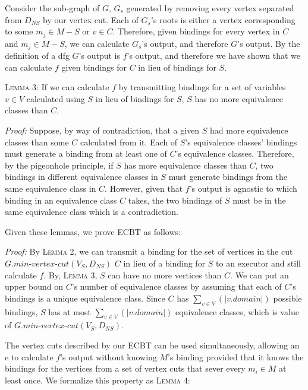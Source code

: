 Consider the sub-graph of $G$, $G_s$ generated by removing every vertex separated from $D_{NS}$ by our vertex cut. Each of $G_s$'s roots is either a vertex corresponding to some $m_j \in M - S$ or $v \in C$. Therefore, given bindings for every vertex in $C$ and $m_j \in M - S$, we can calculate $G_s$'s output, and therefore $G$'s output. By the definition of a dfg $G$'s output is $f$'s output, and therefore we have shown that we can calculate $f$ given bindings for $C$ in lieu of bindings for $S$.

\vspace{1mm}
\noindent \textsc{Lemma 3:} If we can calculate $f$ by transmitting bindings for a set of variables $v \in V$ calculated using $S$ in lieu of bindings for $S$, $S$ has no more equivalence classes than $C$.
\vspace{1mm}

\noindent \textit{Proof:} Suppose, by way of contradiction, that a given $S$ had more equivalence classes than some $C$ calculated from it. Each of $S$'s equivalence classes' bindings must generate a binding from at least one of $C$'s equivalence classes. Therefore, by the pigeonhole principle, if $S$ has more equivalence classes than $C$, two bindings in different equivalence classes in $S$ must generate bindings from the same equivalence class in $C$. However, given that $f$'s output is agnostic to which binding in an equivalence class $C$ takes, the two bindings of $S$ must be in the same equivalence class which is a contradiction.
\vspace{1mm}

\noindent Given these lemmas, we prove ECBT as follows:
\vspace{1mm}

\noindent \textit{Proof:}
By \textsc{Lemma 2}, we can transmit a binding for the set of vertices in the cut $G.\textit{min-vertex-cut}(V_S, D_{NS})$ $C$ in lieu of a binding for $S$ to an executor and still calculate $f$. By, \textsc{Lemma 3}, $S$ can have no more vertices than $C$. We can put an upper bound on $C$'s number of equivalence classes by assuming that each of $C$'s bindings is a unique equivalence class. Since $C$ has $\sum_{v \in V}(|v.domain|)$ possible bindings, $S$ has at most $\sum_{v \in V}(|v.domain|)$ equivalence classes, which is value of $G.\textit{min-vertex-cut}(V_S, D_{NS})$.

The vertex cuts described by our ECBT can be used simultaneously, allowing an e to calculate $f$'s output without knowing $M$'s binding provided that it knows the bindings for the vertices from a set of vertex cuts that sever every $m_i \in M$ at least once. We formalize this property as \textsc{Lemma 4:}
\vspace{1mm}


